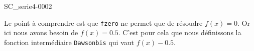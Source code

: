 \begin{corrige}{SC_serie4-0002}


	Le point à comprendre est que \verb+fzero+ ne permet que de résoudre $f(x)=0$. Or ici nous avons besoin de $f(x)=0.5$. C'est pour cela que nous définissons la fonction intermédiaire \verb+Dawsonbis+ qui vaut $f(x)-0.5$.



\end{corrige}

